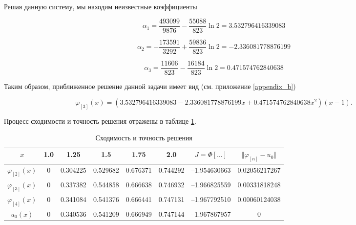 \documentclass{article}
\begin{document}
\noindent Решая данную систему, мы находим неизвестные коэффициенты

\begin{displaymath}
	\alpha_{1} = \frac{493099}{9876} - \frac{55088}{823}\ln{2} = 3.532796416339083
\end{displaymath}

\begin{displaymath}
	\alpha_{2} = -\frac{173591}{3292} + \frac{59836}{823}\ln{2} = -2.336081778876199
\end{displaymath}

\begin{displaymath}
	\alpha_{3} = \frac{11606}{823} - \frac{16184}{823}\ln{2} = 0.471574762840638
\end{displaymath}

\noindent Таким образом, приближенное решение данной задачи имеет вид (см. приложение \ref{appendix_b})

\begin{displaymath}
	\varphi_{[3]}(x) = (3.532796416339083 - 2.336081778876199x + 0.471574762840638 x^2)(x-1).
\end{displaymath}

Процесс сходимости и точность решения отражены в таблице \ref{table_process_of_convergence_rank_3}.

\begin{table}[!h]
\centering
\begin{tabular}{|c|c|c|c|c|c|c|c|}
	\hline
	$x$ & 1.0 & 1.25 & 1.5 & 1.75 & 2.0 & $J = \Phi[\ldots]$ & $\Vert \varphi_{[n]} - u_{0} \Vert$ \\
	\hline \hline

	$\varphi_{[2]}(x)$ & 0 & 0.304225 & 0.529682 & 0.676371 & 0.744292 & –1.954630663 & 0.02056217267 \\	\hline
	$\varphi_{[3]}(x)$ & 0 & 0.337382 & 0.544858 & 0.666638 & 0.746932 & –1.966825559 & 0.00331818248 \\	\hline
	$\varphi_{[4]}(x)$ & 
0 & 0.341084 & 0.541376 & 0.666441 & 0.747131 & –1.967792510 & 0.00060124038 \\	\hline
	$u_{0}(x)$ & 0 & 0.340536 & 0.541209 & 0.666949 & 0.747144 & –1.967867957 & 0 \\	\hline

\end{tabular}
\caption{Сходимость и точность решения}
\label{table_process_of_convergence_rank_3}
\end{table}

\newpage
\end{document}
